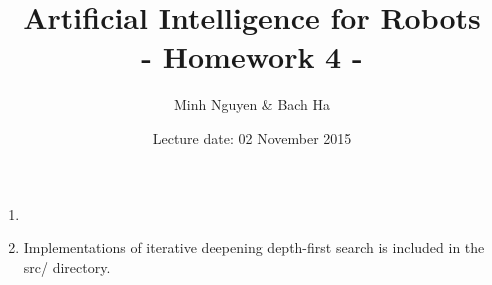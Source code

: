 \documentclass[a4paper, 12pt]{article}
\title{Artificial Intelligence for Robots \\
				- Homework 4 -}
\author{Minh Nguyen \& Bach Ha}
\date{Lecture date: 02 November 2015}
\begin{document}
\maketitle

\begin{enumerate}

	\item 

	\item Implementations of iterative deepening depth-first search is included in the
    src/ directory.


\end{enumerate}
\end{document}
